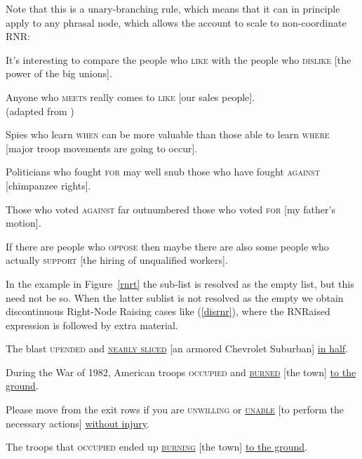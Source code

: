 \documentclass[output=paper]{langsci/langscibook}
\begin{document}
\noindent
Note that this is a unary-branching rule, which means that it can in principle apply to any phrasal node, which allows the account to scale to non-coordinate RNR:

\begin{exe}
\ex \begin{xlista}
\ex  It's interesting to compare the people who \textsc{like} with the people
       who \textsc{dislike} [the power of the big unions].\\
       \citep[550]{hudson}

 \ex Anyone  who \textsc{meets} really comes to \textsc{like} [our sales people].\\
 (adapted from \citet{
williams})\label{will}


\ex   Spies who learn \textsc{when} can be more valuable than those
able to learn \textsc{where} [major troop movements are going to occur].

\ex Politicians who fought \textsc{for} may well snub those
 who have fought \textsc{against} [chimpanzee rights]. \\
\citep{postal94}

\ex Those who voted \textsc{against} far outnumbered those who
voted  \textsc{for} [my father's motion].\\
\citep[1344]{rodney2}


\ex If there are people who \textsc{oppose} then maybe there are also some
  people who actually \textsc{support}  [the hiring of unqualified
  workers].\\
  \citep{chavesrnr}

\end{xlista}


\end{exe}








In the example in Figure~\ref{rnrt}  the sub-list  is resolved as the empty list, but this need not be so. When the latter sublist is not resolved as the empty we obtain discontinuous Right-Node Raising cases like (\ref{disrnr}), 
where the RNRaised expression is followed by extra material.


\begin{exe}
\ex \begin{xlista}
\ex The blast \textsc{upended} and \underline{\textsc{nearly sliced}} [an armored Chevrolet Suburban] \underline{in half}.

\ex During the War of 1982, American troops
\textsc{occupied}  and \underline{\textsc{burned}} [the town] \underline{to the ground}.

\ex Please move from the exit rows if you are \textsc{unwilling} or \underline{\textsc{unable}}
 [to perform the necessary actions] \underline{without injury}.

\ex The troops that \textsc{occupied} ended up \underline{\textsc{burning}}
[the town] \underline{to the ground}.

\end{xlista}\label{disrnr}
\end{exe}
\end{document}
